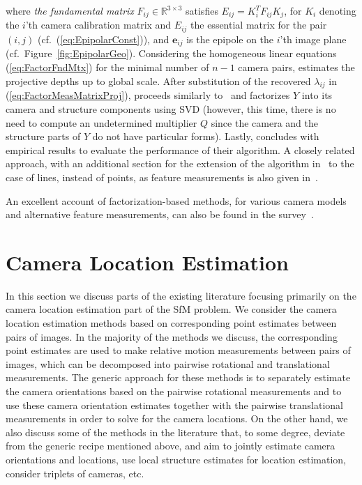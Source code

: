 \documentclass[10pt]{article}
\newcommand{\R}{\ensuremath{\mathbb{R}}}
\begin{document}
where \textit{the fundamental matrix} $F_{ij}\in\R^{3\times3}$ satisfies $E_{ij} = K_{i}^TF_{ij}K_{j}$, for $K_{i}$ denoting the $i$'th camera calibration matrix and $E_{ij}$ the essential matrix for the pair $(i,j)$ (cf.~(\ref{eq:EpipolarConst})), and $\mathbf{e}_{ij}$ is the epipole on the $i$'th image plane (cf.~Figure~\ref{fig:EpipolarGeo}). Considering the homogeneous linear equations (\ref{eq:FactorFndMtx}) for the minimal number of $n-1$ camera pairs, \cite{SturmFactorization} estimates the projective depths up to global scale. After substitution of the recovered $\lambda_{ij}$ in (\ref{eq:FactorMeasMatrixProj}), \cite{SturmFactorization} proceeds similarly to~\cite{TomasiKanadeFactor} and factorizes $Y$ into its camera and structure components using SVD (however, this time, there is no need to compute an undetermined multiplier $Q$ since the camera and the structure parts of $Y$ do not have particular forms). Lastly, \cite{SturmFactorization} concludes with empirical results to evaluate the performance of their algorithm. A closely related approach, with an additional section for the extension of the algorithm in~\cite{SturmFactorization} to the case of lines, instead of points, as feature measurements is also given in~\cite{TriggsFactorization}.

An excellent account of factorization-based methods, for various camera models and alternative feature measurements, can also be found in the survey~\cite{KanadeFactorization}.

\section{Camera Location Estimation}
\label{sec:CamLocEst}
In this section we discuss parts of the existing literature focusing primarily on the camera location estimation part of the SfM problem. We consider the camera location estimation methods based on corresponding point estimates between pairs of images. In the majority of the methods we discuss, the corresponding point estimates are used to make relative motion measurements between pairs of images, which can be decomposed into pairwise rotational and translational measurements. The generic approach for these methods is to separately estimate the camera orientations based on the pairwise rotational measurements and to use these camera orientation estimates together with the pairwise translational measurements in order to solve for the camera locations. On the other hand, we also discuss some of the methods in the literature that, to some degree, deviate from the generic recipe mentioned above, and aim to jointly estimate camera orientations and locations, use local structure estimates for location estimation, consider triplets of cameras, etc.
\end{document}
